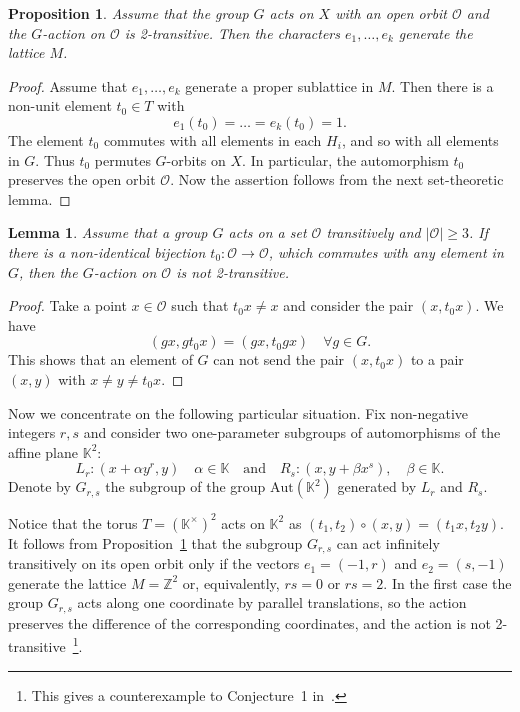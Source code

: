 \documentclass[a4paper,draft,reqno,12pt]{amsart}
\newtheorem{proposition}[theorem]{Proposition}
\newtheorem{lemma}[theorem]{Lemma}
\theoremstyle{definition}
\theoremstyle{remark}
\def\KK{{\mathbb K}}
\def\ZZ{{\mathbb Z}}
\def\OOO{\mathcal{O}}
\renewcommand{\ge}{\geqslant}
\begin{document}
\begin{proposition} \label{prop-a}
Assume that the group $G$ acts on $X$ with an open orbit $\OOO$ and the $G$-action on $\OOO$ is 2-transitive. Then the characters $e_1,\ldots,e_k$ generate the lattice $M$.
\end{proposition}

\begin{proof}
Assume that $e_1,\ldots,e_k$ generate a proper sublattice in $M$. Then there is a non-unit element $t_0\in T$ with 
$$
e_1(t_0)=\ldots=e_k(t_0)=1. 
$$
The element $t_0$ commutes with all elements in each $H_i$, and so with all elements in $G$. Thus $t_0$ permutes $G$-orbits on $X$. In particular, the automorphism $t_0$ preserves the open orbit $\OOO$. Now the assertion follows from the next set-theoretic lemma.
\end{proof}

\begin{lemma}
Assume that a group $G$ acts on a set $\OOO$ transitively and $|\OOO|\ge 3$. If there is a non-identical bijection $t_0\colon \OOO\to\OOO$, which commutes with any element in $G$, then the $G$-action on $\OOO$ is not 2-transitive. 
\end{lemma}

\begin{proof}
Take a point $x\in\OOO$ such that $t_0x\ne x$ and consider the pair $(x,t_0x)$. We have 
$$
(gx,gt_0x)=(gx,t_0gx) \quad \forall g\in G.
$$
This shows that an element of $G$ can not send the pair $(x,t_0x)$ to a pair $(x,y)$ with ${x\ne y\ne t_0x}$. 
\end{proof}

Now we concentrate on the following particular situation. Fix non-negative integers $r,s$ and consider two one-parameter subgroups of automorphisms of the affine plane $\KK^2$:
$$
L_r\colon (x+\alpha y^r,y)\quad \alpha\in\KK \quad \text{and}\quad R_s\colon (x,y+\beta x^s), \quad \beta\in\KK.
$$
Denote by $G_{r,s}$ the subgroup of the group $\text{Aut}(\KK^2)$ generated by $L_r$ and $R_s$. 

Notice that the torus $T=(\KK^{\times})^2$ acts on $\KK^2$ as $(t_1,t_2)\circ (x,y)=(t_1x,t_2y)$. 
It follows from Proposition~\ref{prop-a} that the subgroup $G_{r,s}$ can act infinitely transitively on its open orbit only if the vectors $e_1=(-1,r)$ and $e_2=(s,-1)$ generate the lattice $M=\ZZ^2$ or, equivalently, $rs=0$ or $rs=2$. In the first case the group $G_{r,s}$ acts along one coordinate by parallel translations, so the action preserves the difference of the corresponding coordinates, and the action is not 2-transitive~\footnote{This gives a counterexample to Conjecture~1 in~\cite{CT}.}. 
\end{document}
